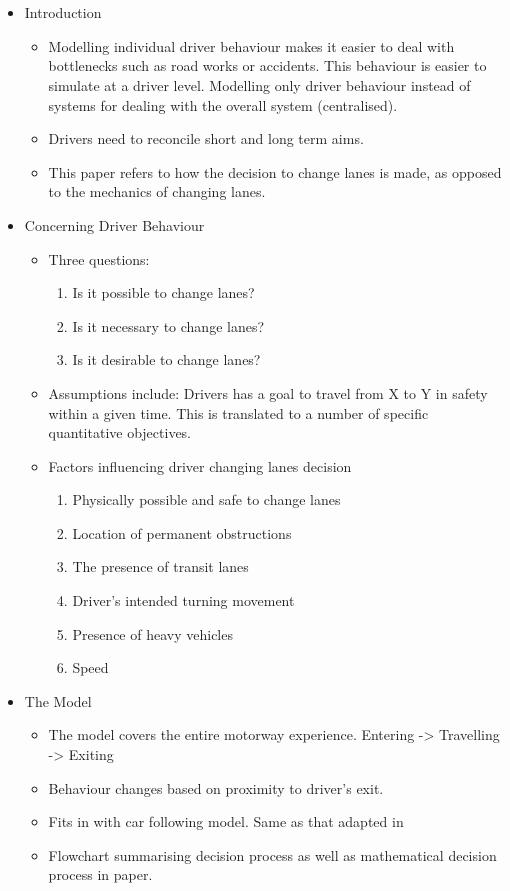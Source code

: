 \section{}
\label{sec:Gipps1986}
\begin{itemize}
\item Introduction
\begin{itemize}
\item Modelling individual driver behaviour makes it easier to deal with bottlenecks such as road works or accidents. This behaviour is easier to simulate at a driver level. Modelling only driver behaviour instead of systems for dealing with the overall system (centralised).
\item Drivers need to reconcile short and long term aims.
\item This paper refers to how the decision to change lanes is made, as opposed to the mechanics of changing lanes.
\end{itemize}
\item Concerning Driver Behaviour
\begin{itemize}
\item Three questions:
\begin{enumerate}
\item Is it possible to change lanes?
\item Is it necessary to change lanes?
\item Is it desirable to change lanes?
\end{enumerate}
\item Assumptions include: Drivers has a goal to travel from X to Y in safety within a given time. This is translated to a number of specific quantitative objectives.
\item Factors influencing driver changing lanes decision
\begin{enumerate}
\item Physically possible and safe to change lanes
\item Location of permanent obstructions
\item The presence of transit lanes
\item Driver's intended turning movement
\item Presence of heavy vehicles
\item Speed
\end{enumerate}
\end{itemize}
\item The Model
\begin{itemize}
\item The model covers the entire motorway experience. Entering -> Travelling -> Exiting
\item Behaviour changes based on proximity to driver's exit.
\item Fits in with car following model. Same as that adapted in \citet{Kesting2007}
\item Flowchart summarising decision process as well as mathematical decision process in paper.
\end{itemize}
\end{itemize}


